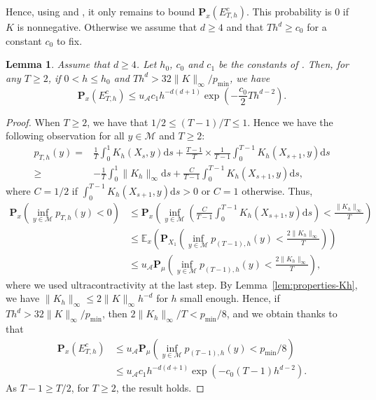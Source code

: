 \documentclass[10pt,a4paper]{article}
\newcommand{\E}{{\mathbb E}}
\renewcommand{\P}{{\mathbf P}}
\newcommand\cA{\mathcal{A}}
\newcommand\cM{\mathcal{M}}
\newcommand\dd{\mathrm{d}}
\newcommand{\PAR}[1]{{{\left(#1\right)}}} %
\newtheorem{lemma}[theorem]{Lemma}
\begin{document}
Hence, using  and , it only remains to bound $ \P_{x}( E^c_{T,h})$. This probability is $0$ if $K$ is nonnegative. Otherwise we assume that $d\ge 4$ and that $Th^{d}\ge c_0$ for a constant $c_0$ to fix.


	\begin{lemma}\label{prop:proba-any-distribution}
 Assume that $d\ge 4$. Let $h_0$, $c_0$ and $c_1$ be  the constants of  . Then, for any $T\ge 2$, if $0<h\le h_0$ and $Th^d>32\|K\|_\infty/p_{\min}$, we have
	\[ \P_{x}\PAR{ E_{T,h}^c }  \le u_\cA c_1h^{-d(d+1)}\exp\PAR{- \frac{c_0}{2}Th^{d-2}}.\]
\end{lemma} 


\begin{proof}{When $T\ge 2$, we have that $1/2\le (T-1)/T\le 1$.
Hence we have the following observation for all $y \in \cM$ and $T\ge 2$:}
\begin{align*}
	p_{T,h}(y)= & \frac{1}{T}\int_0^1 K_h(X_s,y)\dd s +\frac{T-1}{T} \times \frac{1}{T-1}  \int_0^{T-1}  K_h(X_{s+1},y)\dd s \\
	\ge &  - \frac{1}{T} \int_0^1 \| K_h\|_{\infty} \dd s + \frac{{C}}{T-1}  \int_0^{T-1}  K_h(X_{s+1},y)\dd s,
\end{align*}{where $C=1/2$ if $\int_0^{T-1}  K_h(X_{s+1},y)\dd s>0$ or $C=1$ otherwise. }Thus,
	\begin{align*}
		\P_{x}\PAR{ \inf_{ y\in\cM}p_{T,h}(y) <0 } & \le  \P_{x} \PAR{   \inf_{y \in \cM } \PAR{ \frac{{C}}{T-1}  \int_0^{T-1} K_h(X_{s+1},y)\dd s } <\frac{\|K_h\|_{\infty}}{T }}  \\
		 &\le \E_{x} \PAR{\P_{X_1}\PAR{ \inf_{ y\in\cM}p_{(T-1),h}(y) < \frac{2\|K_h\|_{\infty}}{ T }}}\\
&\le u_\cA \P_{\mu}\PAR{ \inf_{ y\in\cM}p_{(T-1),h}(y) < \frac{2\|K_h\|_{\infty}}{  T }},
	\end{align*}
where we used  ultracontractivity at the last step. By Lemma~\ref{lem:properties-Kh}, we have $\|K_h\|_{\infty}\le 2\|K\|_\infty h^{-d}$ for $h$ small enough. Hence, if $Th^d>32\|K\|_\infty/  p_{\min}$, then $2\|K_h\|_{\infty}/T <p_{\min}/8$, and we obtain thanks to  that
\begin{align*}
    \P_{x}\PAR{E_{T,h}^c}&\le u_\cA \P_{\mu}\PAR{ \inf_{ y\in\cM}p_{(T-1),h}(y) < p_{\min}/8}\\
&\le u_\cA c_{1}h^{-d(d+1)}\exp(-c_0(T-1)h^{d-2}).
\end{align*}
As $T-1\ge T/2$, for $T\ge 2$, the result holds.
\end{proof}
\end{document}
